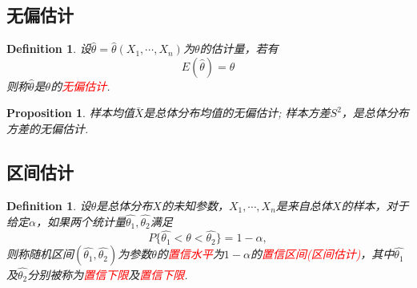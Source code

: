 \documentclass{article}
\newtheorem{proposition}[theorem]{Proposition}
\newtheorem{definition}[theorem]{Definition}
\newcommand{\redt}[1]{\textcolor{red}{#1}}
\begin{document}
\subsection{无偏估计}

\begin{definition}
\rm 设$\widehat{\theta} = \widehat{\theta}(X_1,\cdots,X_n)$为$\theta$的估计量，若有
$$
E(\widehat{\theta}) = \theta
$$
则称$\widehat{\theta}$是$\theta$的\redt{无偏估计}.
\end{definition}


\begin{proposition}
\rm 样本均值$\bar{X}$是总体分布均值的无偏估计; 样本方差$S^2$，是总体分布方差的无偏估计.
\end{proposition}

\subsection{区间估计}

\begin{definition}
\rm 设$\theta$是总体分布$X$的未知参数，$X_1,\cdots,X_n$是来自总体$X$的样本，对于给定$\alpha$，如果两个统计量$\widehat{\theta_1},\widehat{\theta_2}$满足
$$
P\{\widehat{\theta_1} < \theta < \widehat{\theta_2}\} = 1-\alpha,
$$
则称随机区间$(\widehat{\theta_1},\widehat{\theta_2})$为参数$\theta$的\redt{置信水平}为$1-\alpha$的\redt{置信区间(区间估计)}，其中$\widehat{\theta_1}$及$\widehat{\theta_2}$分别被称为\redt{置信下限}及\redt{置信下限}. 
\end{definition}
\end{document}
